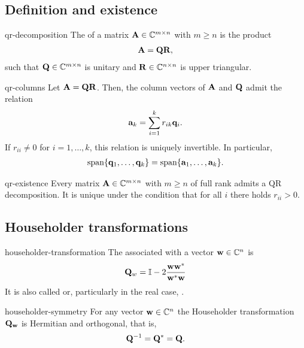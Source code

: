 
\subsection{Definition and existence}
\begin{Definition}{qr-decomposition}
  The  of a matrix $\mathbf A\in\mathbb C^{m\times n}$
  with $m\ge n$ is the product
  \begin{gather}
    \mathbf A = \mathbf Q\mathbf R,
  \end{gather}
  such that $\mathbf Q \in\mathbb C^{m\times n}$ is unitary and
  $\mathbf R\in \mathbb C^{n\times n}$ is upper triangular.
\end{Definition}

\begin{Lemma}{qr-columns}
  Let $\mathbf A = \mathbf Q\mathbf R$. Then, the column vectors of $\mathbf A$ and
  $\mathbf Q$ admit the relation
  \begin{gather}
    \mathbf a_k = \sum_{i=1}^k r_{ik} \mathbf q_i.
  \end{gather}
  If $r_{ii}\neq 0$ for $i=1,\dots,k$, this relation is uniquely
  invertible. In particular,
  \begin{gather}
    \operatorname{span}\{\mathbf q_1,\dots,\mathbf q_k\}
    = 
    \operatorname{span}\{\mathbf a_1,\dots,\mathbf a_k\}.
  \end{gather}
\end{Lemma}

\begin{Theorem}{qr-existence}
  Every matrix $\mathbf A\in\mathbb C^{m\times n}$ with $m\ge n$ of full rank
  admits a QR decomposition. It is unique under the condition that for
  all $i$ there holds $r_{ii} > 0$.
\end{Theorem}

\subsection{Householder transformations}

\begin{Definition}{householder-transformation}
  The 
  associated with a vector $\mathbf w\in\mathbb C^n$ is
  \begin{gather}
    \mathbf Q_w = \mathbb I - 2\frac{\mathbf w\mathbf w^*}{\mathbf w^*\mathbf w}
  \end{gather}
  It is also called  or, particularly in
  the real case, .
\end{Definition}

\begin{Lemma}{householder-symmetry}
  For any vector $\mathbf w\in\mathbb C^n$ the Householder transformation
  $\mathbf Q_{\mathbf w}$ is Hermitian and orthogonal, that is,
  \begin{gather}
    \mathbf Q^{-1} = \mathbf Q^* = \mathbf Q.
  \end{gather}
\end{Lemma}

